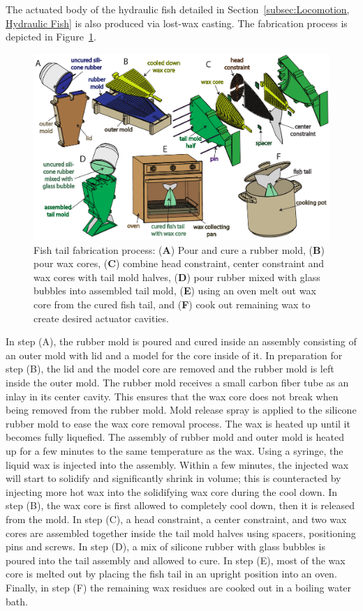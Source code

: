 The actuated body of the hydraulic fish detailed in Section~\ref{subsec:Locomotion, Hydraulic Fish} is also produced via lost-wax casting. The fabrication process is depicted in Figure~\ref{fig:fabrication}.
\begin{figure}
        \centering
         \includegraphics[width=0.99\columnwidth]{figures/fabrication/fab_hydraulic_fish_tail.pdf}
         \caption[Fish tail fabrication process]{Fish tail fabrication process: (\textbf{A}) Pour and cure a rubber mold, (\textbf{B}) pour wax cores, (\textbf{C}) combine head constraint, center constraint and wax cores with tail mold halves, (\textbf{D}) pour rubber mixed with glass bubbles into assembled tail mold, (\textbf{E}) using an oven melt out wax core from the cured fish tail, and (\textbf{F}) cook out remaining wax to create desired actuator cavities.}\label{fig:fabrication}
\end{figure}
In step (A), the rubber mold is poured and cured inside an assembly consisting of an outer mold with lid and a model for the core inside of it.
In preparation for step (B), the lid and the model core are removed and the rubber mold is left inside the outer mold.
The rubber mold receives a small carbon fiber tube as an inlay in its center cavity.
This ensures that the wax core does not break when being removed from the rubber mold.
Mold release spray is applied to the silicone rubber mold to ease the wax core removal process.
The wax is heated up until it becomes fully liquefied.
The assembly of rubber mold and outer mold is heated up for a few minutes to the same temperature as the wax.
Using a syringe, the liquid wax is injected into the assembly.
Within a few minutes, the injected wax will start to solidify and significantly shrink in volume; this is counteracted by injecting more hot wax into the solidifying wax core during the cool down.
In step (B), the wax core is first allowed to completely cool down, then it is released from the mold.
In step (C), a head constraint, a center constraint, and two wax cores are assembled together inside the tail mold halves using spacers, positioning pins and screws.
In step (D), a mix of silicone rubber with glass bubbles is poured into the tail assembly and allowed to cure.
In step (E), most of the wax core is melted out by placing the fish tail in an upright position into an oven. Finally, in step (F) the remaining wax residues are cooked out in a boiling water bath.

